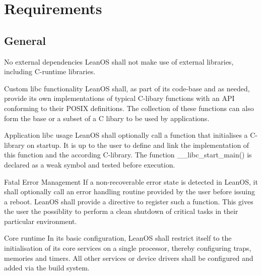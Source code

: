 \chapter{Requirements}

\section{General}


 {No external dependencies}{%
LeanOS shall not make use of external libraries, including C-runtime libraries.
}{}%

 {Custom libc functionality}{%
LeanOS shall, as part of its code-base and as needed, provide its own
implementations of typical C-libary functions with an \gls{API} conforming to
their \gls{POSIX} definitions.
}{%
The collection of these functions can also form the base or a subset of a
C libary to be used by applications.}%

 {Application libc usage}{%
LeanOS shall optionally call a function that initialises a C-library on startup.
It is up to the user to define and link the implementation of this function and
the according C-library.
}{%
The function \_\_libc\_start\_main() is declared as a weak symbol and tested
before execution.
}%


%
%
%
%

 {Fatal Error Management}{%
If a non-recoverable error state is detected in LeanOS, it shall optionally
call an error handling routine provided by the user before issuing a reboot.
LeanOS shall provide a directive to register such a function.
}{%
This gives the user the possiblity to perform a clean shutdown of critical
tasks in their particular environment.}%


 {Core runtime}{%
In its basic configuration, LeanOS shall restrict itself to the initialisation
of its core services on a single processor, thereby configuring traps, memories
and timers. All other services or device drivers shall be configured and added
via the build system.
}{}%

